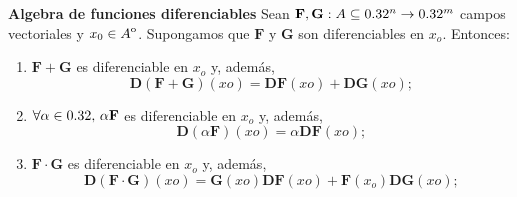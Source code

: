 \begin{propertie}\label{prop:alg_dif_gen}  \textbf{Algebra de funciones diferenciables}  Sean $\mathbf{F},\mathbf{G}:A  \subseteq  0.32^n \to 0.32^{m}$ campos vectoriales y $x_0 \in {\kern0ptA}^{\mathrm{o}}$. Supongamos que $\mathbf{F}$ y $\mathbf{G}$ son diferenciables en $x_o$.
  Entonces:
  \begin{enumerate} 
   \item[1.] $\mathbf{F} + \mathbf{G}$ es diferenciable en $x_o$ y, adem\'as,
   \[
    \boldsymbol{D} (\mathbf{F+G})(xo) = \boldsymbol{D} \mathbf{F}(xo) + \boldsymbol{D} \mathbf{G}(xo);
   \]

   \item[2.] $\forall \alpha \in 0.32, \,  \alpha \mathbf{F}$  es diferenciable en $x_o$ y, adem\'as,
   \[
    \boldsymbol{D}(\alpha \mathbf{F})(xo) = \alpha \boldsymbol{D} \mathbf{F}(xo);
   \]

   \item[3.] $\mathbf{F} \cdot \mathbf{G}$ es diferenciable en $x_o$ y, adem\'as,
   \[
    \boldsymbol{D}(\mathbf{F} \cdot \mathbf{G})(xo) = \mathbf{G}(xo) \boldsymbol{D} \mathbf{F}(xo) + \mathbf{F}(x_o) \boldsymbol{D}  \mathbf{G}(xo);
   \]
\end{enumerate}
\end{propertie}



